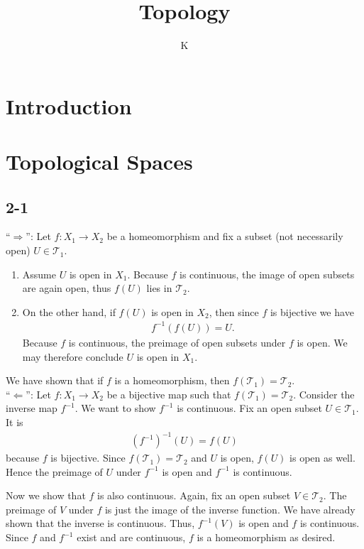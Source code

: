 \documentclass[a4paper]{book}
\title{Topology}
\author{K}
\theoremstyle{definition}
\begin{document}
\maketitle
\tableofcontents
\chapter{Introduction}
\chapter{Topological Spaces}
\section*{2-1}
``\(\Rightarrow\)'': Let \(f: X_1 \longrightarrow X_2\) be a homeomorphism and fix a subset (not necessarily open) \(U \in \mathcal{T}_1\).
\begin{enumerate}
    \item Assume \(U\) is open in \(X_1\). Because \(f\) is continuous, the image of open subsets are again open, thus \(f(U)\) lies in \(\mathcal{T}_2\).
    \item On the other hand, if \(f(U)\) is open in \(X_2\), then since \(f\) is bijective we have
    \begin{align*}
        f^{-1} \left(f \left(U\right)\right) = U \text{.}
    \end{align*}
    Because \(f\) is continuous, the preimage of open subsets under \(f\) is open. We may therefore conclude \(U\) is open in \(X_1\).
\end{enumerate}
We have shown that if \(f\) is a homeomorphism, then \(f(\mathcal{T}_1) = \mathcal{T}_2\). \\

\noindent ``\(\Leftarrow\)'': Let \(f: X_1 \longrightarrow X_2\) be a bijective map such that \(f(\mathcal{T}_1) = \mathcal{T}_2\). Consider the inverse map \(f^{-1}\). We want to show \(f^{-1}\) is continuous. Fix an open subset \(U \in \mathcal{T}_1\). It is
\begin{align*}
    \left(f^{-1}\right)^{-1} \left(U\right) = f(U)
\end{align*}
because \(f\) is bijective. Since \(f(\mathcal{T}_1) = \mathcal{T}_2\) and \(U\) is open, \(f(U)\) is open as well. Hence the preimage of \(U\) under \(f^{-1}\) is open and \(f^{-1}\) is continuous.

Now we show that \(f\) is also continuous. Again, fix an open subset \(V \in \mathcal{T}_2\). The preimage of \(V\) under \(f\) is just the image of the inverse function. We have already shown that the inverse is continuous. Thus, \(f^{-1}(V)\) is open and \(f\) is continuous. Since \(f\) and \(f^{-1}\) exist and are continuous, \(f\) is a homeomorphism as desired.
\end{document}
